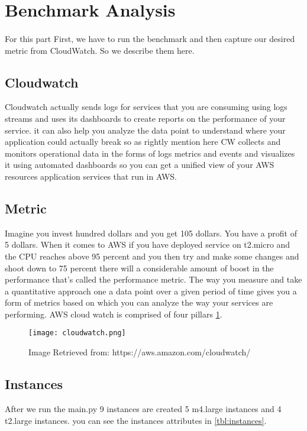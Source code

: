 \documentclass[12pt]{article}
\begin{document}
\section{Benchmark Analysis} \label{sec:benchmark}
	\paragraph{} For  this part First, we have to run the benchmark and then capture our desired metric from CloudWatch. So we describe them here.
        \subsection{Cloudwatch}
        Cloudwatch actually sends logs for services that you are consuming using logs streams and uses its dashboards to create reports on the performance of your service. it can also help you analyze the data point to understand where your application could actually break so as rightly mention here CW collects and monitors operational data in the forms of logs metrics and events and visualizes it using automated dashboards  so you can get a unified view of your AWS resources application services that run in AWS.
        \subsection{Metric}
        Imagine you invest hundred dollars and you get 105 dollars. You have a profit of 5 dollars.
        When it comes to AWS if you have deployed service on t2.micro and the CPU reaches above 95 percent and you then try and make some changes and shoot down to 75 percent there will a considerable amount of boost in the performance that's called the performance metric. The way you measure and take a quantitative approach one a data point over a given period of time gives you a form of metrics based on which you can analyze the way your services are performing. AWS cloud watch is comprised of four pillars \ref{fig:cw}.

        \begin{figure}[htpb]
        \captionsetup{font=footnotesize,labelfont=footnotesize}
        \centering
        \texttt{[image: cloudwatch.png]}
            \caption{Image Retrieved from: https://aws.amazon.com/cloudwatch/}
            \label{fig:cw}
        \end{figure}

        \subsection{Instances}
        After we run the main.py 9 instances are created 5 m4.large instances and 4 t2.large instances. you can see the instances attributes in \ref{tbl:instances}. 
\end{document}
